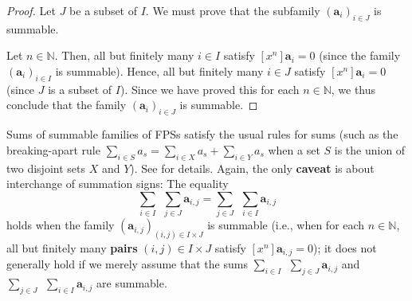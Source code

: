 \begin{proof}
\leanok
Let $J$ be a subset of $I$.
We must prove that the subfamily $\left(\mathbf{a}_{i}\right)_{i\in J}$ is summable.

Let $n\in\mathbb{N}$. Then, all but finitely many $i\in I$ satisfy $\left[
x^{n}\right]\mathbf{a}_{i}=0$ (since the family $\left(\mathbf{a}%
_{i}\right)_{i\in I}$ is summable). Hence, all but finitely many $i\in J$
satisfy $\left[x^{n}\right]\mathbf{a}_{i}=0$ (since $J$ is a subset of
$I$). Since we have proved this for each $n\in\mathbb{N}$, we thus conclude
that the family $\left(\mathbf{a}_{i}\right)_{i\in J}$ is summable.
\end{proof}

\begin{proposition}
\label{prop.fps.summable-sums-rule}
\leantarget
\leanok
Sums of summable families of FPSs satisfy
the usual rules for sums (such as the breaking-apart rule $\sum_{i\in S}%
a_{s}=\sum_{i\in X}a_{s}+\sum_{i\in Y}a_{s}$ when a set $S$ is the union of
two disjoint sets $X$ and $Y$). See \cite[Proposition 7.2.11]{19s} for
details. Again, the only \textbf{caveat} is about interchange
of summation signs: The equality
\[
\sum_{i\in I}\ \ \sum_{j\in J}\mathbf{a}_{i,j}=\sum_{j\in J}\ \ \sum_{i\in
I}\mathbf{a}_{i,j}
\]
holds when the family $\left(\mathbf{a}_{i,j}\right)_{\left(i,j\right)
\in I\times J}$ is summable (i.e., when for each $n\in\mathbb{N}$, all but
finitely many \textbf{pairs} $\left(i,j\right) \in I\times J$ satisfy
$\left[x^{n}\right]\mathbf{a}_{i,j}=0$); it does not generally hold if we
merely assume that the sums $\sum_{i\in I}\ \ \sum_{j\in J}\mathbf{a}_{i,j}$
and $\sum_{j\in J}\ \ \sum_{i\in I}\mathbf{a}_{i,j}$ are summable.
\end{proposition}

